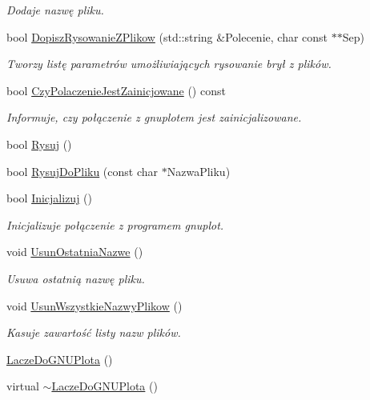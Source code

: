 \begin{DoxyCompactItemize}
\begin{DoxyCompactList}\small\item\em Dodaje nazwę pliku. \end{DoxyCompactList}\item 
bool \mbox{\hyperlink{class_pz_g_1_1_lacze_do_g_n_u_plota_ad3d7607946b82aa941d786dcd086d27e}{Dopisz\+Rysowanie\+Z\+Plikow}} (std\+::string \&Polecenie, char const $\ast$$\ast$Sep)
\begin{DoxyCompactList}\small\item\em Tworzy listę parametrów umożliwiających rysowanie brył z plików. \end{DoxyCompactList}\item 
bool \mbox{\hyperlink{class_pz_g_1_1_lacze_do_g_n_u_plota_af8be8aeb3b1b524fab67d4411cba5b9e}{Czy\+Polaczenie\+Jest\+Zainicjowane}} () const
\begin{DoxyCompactList}\small\item\em Informuje, czy połączenie z {\itshape gnuplot\textquotesingle{}em} jest zainicjalizowane. \end{DoxyCompactList}\item 
bool \mbox{\hyperlink{class_pz_g_1_1_lacze_do_g_n_u_plota_a065f5b8402737cc62b0ad4f66d028335}{Rysuj}} ()
\item 
bool \mbox{\hyperlink{class_pz_g_1_1_lacze_do_g_n_u_plota_addae9ac156ae2fb227f792faff3aa148}{Rysuj\+Do\+Pliku}} (const char $\ast$Nazwa\+Pliku)
\item 
bool \mbox{\hyperlink{class_pz_g_1_1_lacze_do_g_n_u_plota_a200ce6bdb980c314a9eafe49e8f2dd5e}{Inicjalizuj}} ()
\begin{DoxyCompactList}\small\item\em Inicjalizuje połączenie z programem {\itshape gnuplot}. \end{DoxyCompactList}\item 
void \mbox{\hyperlink{class_pz_g_1_1_lacze_do_g_n_u_plota_a75f599f17413ea8602c6dbba09f36407}{Usun\+Ostatnia\+Nazwe}} ()
\begin{DoxyCompactList}\small\item\em Usuwa ostatnią nazwę pliku. \end{DoxyCompactList}\item 
void \mbox{\hyperlink{class_pz_g_1_1_lacze_do_g_n_u_plota_a89a1d90d017d264cd26398464d074073}{Usun\+Wszystkie\+Nazwy\+Plikow}} ()
\begin{DoxyCompactList}\small\item\em Kasuje zawartość listy nazw plików. \end{DoxyCompactList}\item 
\mbox{\hyperlink{class_pz_g_1_1_lacze_do_g_n_u_plota_a5845189b5ab8c3634acf57024e5deeaf}{Lacze\+Do\+G\+N\+U\+Plota}} ()
\item 
virtual \mbox{\hyperlink{class_pz_g_1_1_lacze_do_g_n_u_plota_afc10ec7f193032ecae714f6d832dcbf0}{$\sim$\+Lacze\+Do\+G\+N\+U\+Plota}} ()
\end{DoxyCompactItemize}
